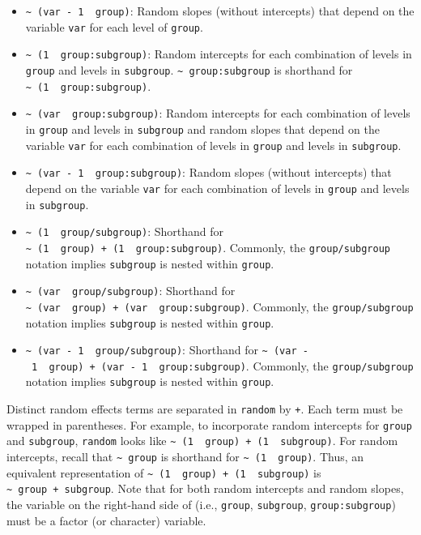\documentclass{article}
\providecommand{\tightlist}{%
  \setlength{\itemsep}{0pt}\setlength{\parskip}{0pt}}
\begin{document}
\begin{itemize}
\tightlist
\item
  \texttt{\textasciitilde{}\ (var\ -\ 1\ \textbar{}\ group)}: Random
  slopes (without intercepts) that depend on the variable \texttt{var}
  for each level of \texttt{group}.
\item
  \texttt{\textasciitilde{}\ (1\ \textbar{}\ group:subgroup)}: Random
  intercepts for each combination of levels in \texttt{group} and levels
  in \texttt{subgroup}. \texttt{\textasciitilde{}\ group:subgroup} is
  shorthand for
  \texttt{\textasciitilde{}\ (1\ \textbar{}\ group:subgroup)}.
\item
  \texttt{\textasciitilde{}\ (var\ \textbar{}\ group:subgroup)}: Random
  intercepts for each combination of levels in \texttt{group} and levels
  in \texttt{subgroup} and random slopes that depend on the variable
  \texttt{var} for each combination of levels in \texttt{group} and
  levels in \texttt{subgroup}.
\item
  \texttt{\textasciitilde{}\ (var\ -\ 1\ \textbar{}\ group:subgroup)}:
  Random slopes (without intercepts) that depend on the variable
  \texttt{var} for each combination of levels in \texttt{group} and
  levels in \texttt{subgroup}.
\item
  \texttt{\textasciitilde{}\ (1\ \textbar{}\ group/subgroup)}: Shorthand
  for
  \texttt{\textasciitilde{}\ (1\ \textbar{}\ group)\ +\ (1\ \textbar{}\ group:subgroup)}.
  Commonly, the \texttt{group/subgroup} notation implies
  \texttt{subgroup} is nested within \texttt{group}.
\item
  \texttt{\textasciitilde{}\ (var\ \textbar{}\ group/subgroup)}:
  Shorthand for
  \texttt{\textasciitilde{}\ (var\ \textbar{}\ group)\ +\ (var\ \textbar{}\ group:subgroup)}.
  Commonly, the \texttt{group/subgroup} notation implies
  \texttt{subgroup} is nested within \texttt{group}.
\item
  \texttt{\textasciitilde{}\ (var\ -\ 1\ \textbar{}\ group/subgroup)}:
  Shorthand for
  \texttt{\textasciitilde{}\ (var\ -\ 1\ \textbar{}\ group)\ +\ (var\ -\ 1\ \textbar{}\ group:subgroup)}.
  Commonly, the \texttt{group/subgroup} notation implies
  \texttt{subgroup} is nested within \texttt{group}.
\end{itemize}

Distinct random effects terms are separated in \texttt{random} by
\texttt{+}. Each term must be wrapped in parentheses. For example, to
incorporate random intercepts for \texttt{group} and \texttt{subgroup},
\texttt{random} looks like
\texttt{\textasciitilde{}\ (1\ \textbar{}\ group)\ +\ (1\ \textbar{}\ subgroup)}.
For random intercepts, recall that \texttt{\textasciitilde{}\ group} is
shorthand for \texttt{\textasciitilde{}\ (1\ \textbar{}\ group)}. Thus,
an equivalent representation of
\texttt{\textasciitilde{}\ (1\ \textbar{}\ group)\ +\ (1\ \textbar{}\ subgroup)}
is \texttt{\textasciitilde{}\ group\ +\ subgroup}. Note that for both
random intercepts and random slopes, the variable on the right-hand side
of \texttt{\textbar{}} (i.e., \texttt{group}, \texttt{subgroup},
\texttt{group:subgroup}) must be a factor (or character) variable.



\end{document}
